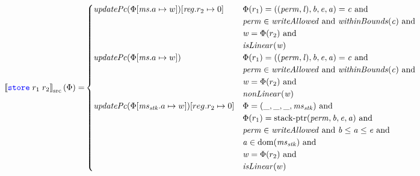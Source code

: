 \documentclass[a4paper]{article}
\newcommand{\sem}[1]{\left\llbracket #1 \right\rrbracket}
\newcommand{\ssem}[2][\Phi]{\sem{#2}_{\mathrm{src}}(#1)}
\newcommand{\dom}{\mathrm{dom}}
\newcommand{\tand}{\text{ and }}
\newcommand{\sourcecolor}[1]{\color{blue}}
\newcommand{\src}[1]{{\sourcecolor{} #1}}
\newcommand{\zinstr}[1]{\texttt{#1}}
\newcommand{\twoinstr}[3]{
  \ifthenelse{\equal{#2#3}{}}
  {\zinstr{#1}}
  {\zinstr{#1} \; #2 \; #3}
}
\newcommand{\sstore}[2]{\twoinstr{\src{store}}{#1}{#2}}
\newcommand{\update}[2]{[#1 \mapsto #2]}
\newcommand{\perm}{\var{perm}}
\newcommand{\lin}{\var{l}}
\newcommand{\stkptr}[1]{\mathrm{stack\text{-}ptr}(#1)}
\newcommand{\var}[1]{\mathit{#1}}
\newcommand{\reg}{\var{reg}}
\newcommand{\ms}{\var{ms}}
\newcommand{\stk}{\var{stk}}
\newcommand{\baddr}{\var{b}}
\newcommand{\eaddr}{\var{e}}
\newcommand{\aaddr}{\var{a}}
\newcommand{\plainfun}[2]{
  \ifthenelse{\equal{#2}{}}
  {\mathit{#1}}
  {\mathit{#1}(#2)}
}
\newcommand{\updPcAddr}[1]{\plainfun{updatePc}{#1}}
\newcommand{\writeAllowed}[1]{\plainfun{writeAllowed}{#1}}
\newcommand{\nonLinear}[1]{\plainfun{nonLinear}{#1}}
\newcommand{\isLinear}[1]{\plainfun{isLinear}{#1}}
\newcommand{\withinBounds}[1]{\plainfun{withinBounds}{#1}}
\begin{document}
\begin{align*}
  \ssem{\sstore{r_1}{r_2}} = & 
                               \begin{cases}
                                 \updPcAddr{\Phi\update{\ms.a}{w}}\update{\reg.r_2}{0} &
                                 \arraycolsep=0pt
                                 \begin{array}[t]{l}
                                   \Phi(r_1) = ((\perm,\lin),\baddr,\eaddr,\aaddr) = \var{c} \tand\\
                                   \perm \in \writeAllowed{} \tand \withinBounds{\var{c}} \tand \\
                                   \var{w} = \Phi(r_2) \tand \\
                                   \isLinear{\var{w}}
                                 \end{array} \\
                                 \updPcAddr{\Phi\update{\ms.a}{w}} &
                                 \arraycolsep=0pt
                                 \begin{array}[t]{l}
                                   \Phi(r_1) = ((\perm,\lin),\baddr,\eaddr,\aaddr) = \var{c} \tand\\
                                   \perm \in \writeAllowed{} \tand \withinBounds{\var{c}} \tand \\
                                   \var{w} = \Phi(r_2) \tand \\
                                   \nonLinear{\var{w}}
                                 \end{array} \\
%
                                 \updPcAddr{\Phi\update{\ms_\stk.a}{w}}\update{reg.r_2}{0} & 
                                 \arraycolsep=0pt
                                 \begin{array}[t]{l}
                                   \Phi = (\_, \_, \_, \ms_\stk) \tand \\
                                   \Phi(r_1) = \stkptr{\perm,\baddr,\eaddr,\aaddr} \tand \\
                                   \perm \in \writeAllowed{} \tand \baddr \leq \aaddr \leq \eaddr \tand \\
                                   \aaddr \in \dom(\ms_\stk) \tand \\
                                   \var{w} = \Phi(r_2) \tand \\
                                   \isLinear{w} 

\end{array}
\end{cases}
\end{align*}
\end{document}
